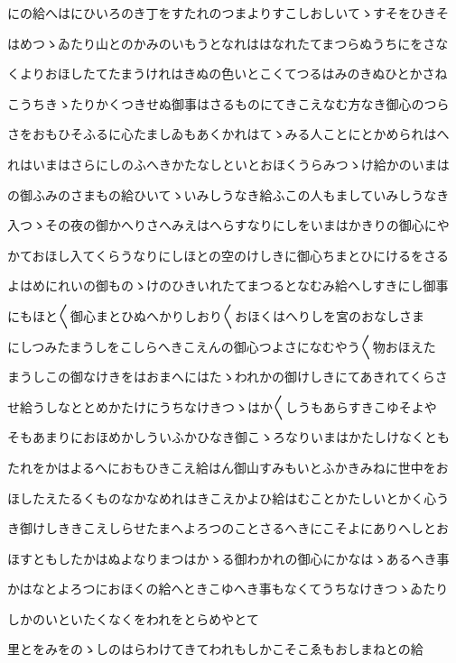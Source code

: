 \documentclass[a4paper,11pt,landscape]{ltjtarticle}
\begin{document}
にの給へはにひいろのき丁をすたれのつまよりすこしおしいてゝすそをひきそ
\par\medskip
はめつゝゐたり山とのかみのいもうとなれははなれたてまつらぬうちにをさな
\par\medskip
くよりおほしたてたまうけれはきぬの色いとこくてつるはみのきぬひとかさね
\par\medskip
こうちきゝたりかくつきせぬ御事はさるものにてきこえなむ方なき御心のつら
\par\medskip
さをおもひそふるに心たましゐもあくかれはてゝみる人ことにとかめられはへ
\par\medskip
れはいまはさらにしのふへきかたなしといとおほくうらみつゝけ給かのいまは
\par\medskip
の御ふみのさまもの給ひいてゝいみしうなき給ふこの人もましていみしうなき
\par\medskip
入つゝその夜の御かへりさへみえはへらすなりにしをいまはかきりの御心にや
\par\medskip
かておほし入てくらうなりにしほとの空のけしきに御心ちまとひにけるをさる
\par\medskip
よはめにれいの御ものゝけのひきいれたてまつるとなむみ給へしすきにし御事
\par\medskip
にもほと〱御心まとひぬへかりしおり〱おほくはへりしを宮のおなしさま
\par\medskip
にしつみたまうしをこしらへきこえんの御心つよさになむやう〱物おほえた
\par\medskip
まうしこの御なけきをはおまへにはたゝわれかの御けしきにてあきれてくらさ
\par\medskip
せ給うしなととめかたけにうちなけきつゝはか〱しうもあらすきこゆそよや
\par\medskip
そもあまりにおほめかしういふかひなき御こゝろなりいまはかたしけなくとも
\par\medskip
たれをかはよるへにおもひきこえ給はん御山すみもいとふかきみねに世中をお
\par\medskip
ほしたえたるくものなかなめれはきこえかよひ給はむことかたしいとかく心う
\par\medskip
き御けしききこえしらせたまへよろつのことさるへきにこそよにありへしとお
\par\medskip
ほすともしたかはぬよなりまつはかゝる御わかれの御心にかなはゝあるへき事
\par\medskip
かはなとよろつにおほくの給へときこゆへき事もなくてうちなけきつゝゐたり
\par\medskip
しかのいといたくなくをわれをとらめやとて
\par\medskip
里とをみをのゝしのはらわけてきてわれもしかこそこゑもおしまねとの給
\end{document}
